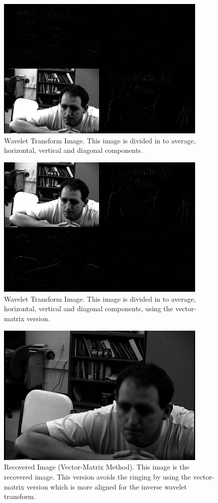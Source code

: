 \documentclass[11pt]{article}
\begin{document}
\begin{figure}
\includegraphics [width=4in]{revWavepic.jpg}
\caption{Wavelet Transform Image.  This image is divided in to average, horizontal, vertical and diagonal components. }
\label{rightWavepic}
\end{figure}


\begin{figure}
\includegraphics [width=4in]{selfWavepic.jpg}
\caption{Wavelet Transform Image.  This image is divided in to average, horizontal, vertical and diagonal components, using the vector-matrix version. }
\label{wavepic}
\end{figure}

\begin{figure}
\includegraphics [width=4in]{selfRecover.jpg}
\caption{Recovered Image (Vector-Matrix Method).  This image is the recovered image.  This version avoids the ringing by using the vector-matrix version which is more aligned for the inverse wavelet transform.  }
\label{rightDanRecovered}
\end{figure}
\end{document}

